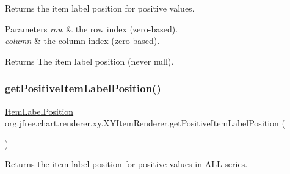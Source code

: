 Returns the item label position for positive values.


\begin{DoxyParams}{Parameters}
{\em row} & the row index (zero-\/based). \\
\hline
{\em column} & the column index (zero-\/based).\\
\hline
\end{DoxyParams}
\begin{DoxyReturn}{Returns}
The item label position (never {\ttfamily null}). 
\end{DoxyReturn}
\mbox{\label{interfaceorg_1_1jfree_1_1chart_1_1renderer_1_1xy_1_1_x_y_item_renderer_ac1193a36db00b567c752f769e6cdcbbc}} 
\subsubsection{\texorpdfstring{get\+Positive\+Item\+Label\+Position()}{getPositiveItemLabelPosition()}\hspace{0.1cm}{\footnotesize\ttfamily [2/2]}}
{\footnotesize\ttfamily \mbox{\hyperlink{classorg_1_1jfree_1_1chart_1_1labels_1_1_item_label_position}{Item\+Label\+Position}} org.\+jfree.\+chart.\+renderer.\+xy.\+X\+Y\+Item\+Renderer.\+get\+Positive\+Item\+Label\+Position (\begin{DoxyParamCaption}{ }\end{DoxyParamCaption})}

Returns the item label position for positive values in A\+LL series.

